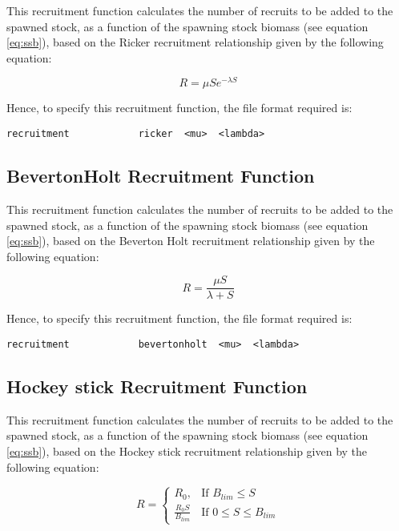 \documentclass[]{book}
\begin{document}
This recruitment function calculates the number of recruits to be added
to the spawned stock, as a function of the spawning stock biomass (see
equation \eqref{eq:ssb}), based on the Ricker recruitment relationship given
by the following equation:

\begin{equation}
\label{eq:rec3}
R = \mu S e ^{-\lambda S}\end{equation}

Hence, to specify this recruitment function, the file format required
is:

\begin{verbatim}
recruitment            ricker  <mu>  <lambda>
\end{verbatim}

\hypertarget{bevertonholt-recruitment-function}{%
\subsection{BevertonHolt Recruitment Function}\label{bevertonholt-recruitment-function}}

This recruitment function calculates the number of recruits to be added
to the spawned stock, as a function of the spawning stock biomass (see
equation \eqref{eq:ssb}), based on the Beverton Holt recruitment
relationship given by the following equation:

\begin{equation}
\label{eq:rec4}
R = \frac{\mu S}{\lambda + S}\end{equation}

Hence, to specify this recruitment function, the file format required
is:

\begin{verbatim}
recruitment            bevertonholt  <mu>  <lambda>
\end{verbatim}

\hypertarget{hockey-stick-recruitment-function}{%
\subsection{Hockey stick Recruitment Function}\label{hockey-stick-recruitment-function}}

This recruitment function calculates the number of recruits to be added
to the spawned stock, as a function of the spawning stock biomass (see
equation \eqref{eq:ssb}), based on the Hockey stick recruitment relationship
given by the following equation:

\begin{equation}
\label{eq:rec5}
R =  \begin{cases}
R_0,&\text{If } B_{lim} \leq S \\
\frac{R_0S}{B_{lim}} & \text{If } 0 \leq S \leq B_{lim}
\end{cases}\end{equation}
\end{document}
